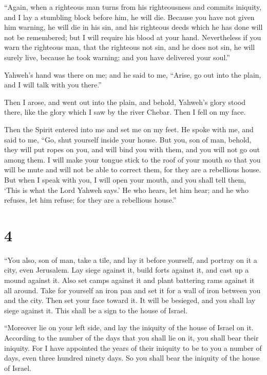  ``Again, when a righteous man turns from his righteousness
and commits iniquity, and I lay a stumbling block before him, he will
die. Because you have not given him warning, he will die in his sin, and
his righteous deeds which he has done will not be remembered; but I will
require his blood at your hand.  Nevertheless if you warn
the righteous man, that the righteous not sin, and he does not sin, he
will surely live, because he took warning; and you have delivered your
soul.''

 Yahweh's hand was there on me; and he said to me, ``Arise,
go out into the plain, and I will talk with you there.''

 Then I arose, and went out into the plain, and behold,
Yahweh's glory stood there, like the glory which I saw by the river
Chebar. Then I fell on my face.

 Then the Spirit entered into me and set me on my feet. He
spoke with me, and said to me, ``Go, shut yourself inside your house.
 But you, son of man, behold, they will put ropes on you,
and will bind you with them, and you will not go out among them.
 I will make your tongue stick to the roof of your mouth so
that you will be mute and will not be able to correct them, for they are
a rebellious house.  But when I speak with you, I will open
your mouth, and you shall tell them, `This is what the Lord Yahweh
says.' He who hears, let him hear; and he who refuses, let him refuse;
for they are a rebellious house.''

\hypertarget{section-3}{%
\section{4}\label{section-3}}

 ``You also, son of man, take a tile, and lay it before
yourself, and portray on it a city, even Jerusalem.  Lay
siege against it, build forts against it, and cast up a mound against
it. Also set camps against it and plant battering rams against it all
around.  Take for yourself an iron pan and set it for a wall
of iron between you and the city. Then set your face toward it. It will
be besieged, and you shall lay siege against it. This shall be a sign to
the house of Israel.

 ``Moreover lie on your left side, and lay the iniquity of
the house of Israel on it. According to the number of the days that you
shall lie on it, you shall bear their iniquity.  For I have
appointed the years of their iniquity to be to you a number of days,
even three hundred ninety days. So you shall bear the iniquity of the
house of Israel.

